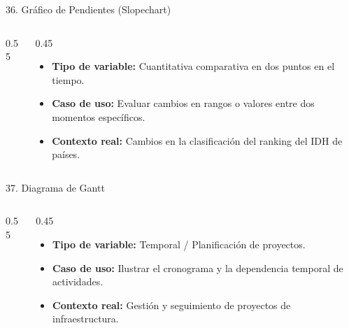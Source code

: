 \documentclass[aspectratio=169,10pt]{beamer}
\begin{document}
\begin{frame}{36. Gráfico de Pendientes (Slopechart)}
\begin{columns}
\begin{column}{0.55\textwidth}
\end{column}
\begin{column}{0.45\textwidth}
\begin{itemize}\small
\item \textbf{Tipo de variable:} Cuantitativa comparativa en dos puntos en el tiempo.
\item \textbf{Caso de uso:} Evaluar cambios en rangos o valores entre dos momentos específicos.
\item \textbf{Contexto real:} Cambios en la clasificación del ranking del IDH de países.
\end{itemize}
\end{column}
\end{columns}
\end{frame}

\begin{frame}{37. Diagrama de Gantt}
\begin{columns}
\begin{column}{0.55\textwidth}
\end{column}
\begin{column}{0.45\textwidth}
\begin{itemize}\small
\item \textbf{Tipo de variable:} Temporal / Planificación de proyectos.
\item \textbf{Caso de uso:} Ilustrar el cronograma y la dependencia temporal de actividades.
\item \textbf{Contexto real:} Gestión y seguimiento de proyectos de infraestructura.
\end{itemize}
\end{column}
\end{columns}
\end{frame}
\end{document}
